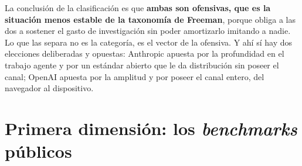 \documentclass[11pt,letterpaper]{article}
\begin{document}
La conclusión de la clasificación es que \textbf{ambas son ofensivas, que es la
situación menos estable de la taxonomía de Freeman}, porque obliga a las dos a
sostener el gasto de investigación sin poder amortizarlo imitando a nadie. Lo
que las separa no es la categoría, es el vector de la ofensiva. Y ahí sí hay dos
elecciones deliberadas y opuestas: Anthropic apuesta por la profundidad en el
trabajo agente y por un estándar abierto que le da distribución sin poseer el
canal; OpenAI apuesta por la amplitud y por poseer el canal entero, del navegador
al dispositivo.

\section{Primera dimensión: los \emph{benchmarks} públicos}
\label{sec:benchmarks}
\end{document}
